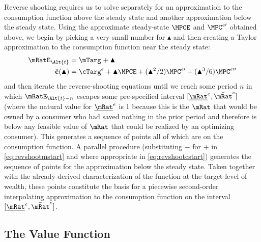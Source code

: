 \documentclass{handout}
\begin{document}
Reverse shooting requires us to solve separately for an approximation to the consumption function above the steady state and 
another approximation below the steady state.  Using the approximate steady-state $\MPCE$ and $\MPC^{e\prime}$ 
obtained above, we begin by picking a very small number for $\blacktriangle$ and then creating a Taylor
approximation to the consumption function near the steady state:
\begin{equation}\begin{gathered}\begin{aligned}
  \mRatE_{\Alt{t}} & = \mTarg^{\null} + \blacktriangle  \label{eq:revshootmstart} 
\\ \tilde{\mathbf{c}}(\blacktriangle) & = \cTarg^{e} + \blacktriangle \MPCE+ (\blacktriangle^{2}/2) \MPC^{e\prime}+ (\blacktriangle^{3}/6) \MPC^{e\prime\prime} \label{eq:revshootcstart}
\end{aligned}\end{gathered}\end{equation}
and then iterate the reverse-shooting equations until we reach some period $n$ in
which $\mRatE_{\Alt{t}-n}$ escapes some pre-specified interval $[\underline{\mRat}^{e},\bar{\mRat}^{e}]$ (where the natural 
value for $\underline{\mRat}^{e}$ is 1 because this is the $\mRat$ that would be owned by a consumer who had saved
nothing in the prior period and therefore is below any feasible value of $\mRat$ that could be realized by an 
optimizing consumer).  This generates a sequence of points all of which
are on the consumption function.  A parallel procedure (substituting $-$ for
$+$ in \eqref{eq:revshootmstart} and where appropriate in \eqref{eq:revshootcstart}) generates the sequence of points for the approximation below the 
steady state.  Taken together with the already-derived characterization of the function
at the target level of wealth, these points constitute the basis for a piecewise second-order interpolating approximation to the
consumption function on the interval $[\underline{\mRat}^{e},\bar{\mRat}^{e}]$.

\subsection{The Value Function}
\end{document}
